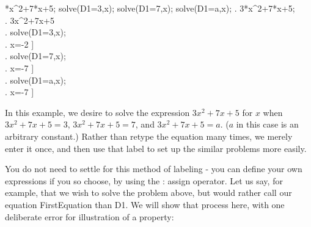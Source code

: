 \vspace{3ex}

\label{Line Labels (Example 4)}

*x^2+7*x+5;
solve(D1=3,x);
solve(D1=7,x);
solve(D1=a,x);
\maximatexsession
{}.  3*x^2+7*x+5; \\
.   3\*x^{2}+7\*x+5 \\
.  solve(D1=3,x); \\
.   \left[ x=-{{1}\over{3}},\linebreak[0]x=-2 \right]  \\
.  solve(D1=7,x); \\
.   \left[ x=-{{\sqrt{73}+7}\over{6}},\linebreak[0]x={{-7
 }} \right]  \\
.  solve(D1=a,x); \\
.   \left[ x=-{{\sqrt{12\*a-11}+7}\over{6}},\linebreak[0]x={{-7}} \right]  \\
\endmaximasession

\vspace{3ex}

In this example, we desire to solve the expression \( 3x^{2}+7x+5 \)
for \( x \) when \( 3x^{2}+7x+5=3 \), \( 3x^{2}+7x+5=7 \), and
\( 3x^{2}+7x+5=a \). (\( a \) in this case is an arbitrary constant.)
Rather than retype the equation many times, we merely enter it once,
and then use that label to set up the similar problems more easily.

You do not need to settle for this method of labeling - you can define
your own expressions if you so choose, by using the : assign operator.
Let us say, for example, that we wish to solve the problem above,
but would rather call our equation FirstEquation than D1. We will
show that process here, with one deliberate error for illustration
of a property:

\vspace{3ex}

\label{Labeling an Equation (Example 5)}

